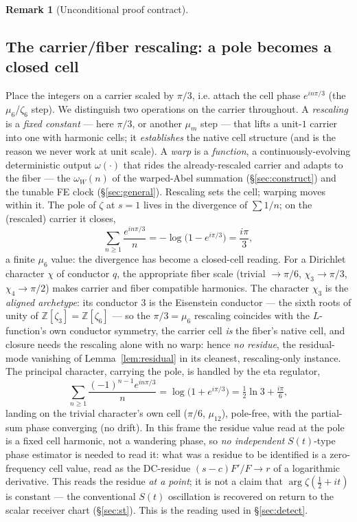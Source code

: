 \documentclass[11pt]{article}
\theoremstyle{definition}
\newtheorem{remark}[theorem]{Remark}
\begin{document}
\begin{remark}[Unconditional proof contract]
\begin{enumerate}
\section{The carrier/fiber rescaling: a pole becomes a closed cell}\label{sec:carrier}

Place the integers on a carrier scaled by $\pi/3$, i.e. attach the cell phase $e^{in\pi/3}$ (the
$\mu_6$/$\zeta_6$ step). We distinguish two operations on the carrier throughout. A \emph{rescaling} is a
\emph{fixed constant} --- here $\pi/3$, or another $\mu_m$ step --- that lifts a unit-$1$ carrier into one
with harmonic cells; it \emph{establishes} the native cell structure (and is the reason we never work at
unit scale). A \emph{warp} is a \emph{function}, a continuously-evolving deterministic output
$\omega(\cdot)$ that rides the already-rescaled carrier and adapts to the fiber --- the $\omega_W(n)$ of the
warped-Abel summation (\S\ref{sec:construct}) and the tunable FE clock (\S\ref{sec:general}). Rescaling sets
the cell; warping moves within it. The pole of $\zeta$ at $s=1$ lives in the divergence of $\sum 1/n$; on
the (rescaled) carrier it closes,
\[
  \sum_{n\ge1}\frac{e^{in\pi/3}}{n}=-\log\!\big(1-e^{i\pi/3}\big)=\frac{i\pi}{3},
\]
a finite $\mu_6$ value: the divergence has become a closed-cell reading. For a Dirichlet character
$\chi$ of conductor $q$, the appropriate fiber scale (trivial $\to\pi/6$, $\chi_3\to\pi/3$,
$\chi_4\to\pi/2$) makes carrier and fiber compatible harmonics. The character $\chi_3$ is the
\emph{aligned archetype}: its conductor $3$ is the Eisenstein conductor --- the sixth roots of unity of
$\mathbb Z[\zeta_3]=\mathbb Z[\zeta_6]$ --- so the $\pi/3=\mu_6$ rescaling coincides with the $L$-function's
own conductor symmetry, the carrier cell \emph{is} the fiber's native cell, and closure needs the rescaling
alone with no warp: hence \emph{no residue}, the residual-mode vanishing of Lemma~\ref{lem:residual} in its
cleanest, rescaling-only instance. The principal character, carrying the
pole, is handled by the eta regulator,
\[
  \sum_{n\ge1}\frac{(-1)^{n-1}e^{in\pi/3}}{n}=\log\!\big(1+e^{i\pi/3}\big)=\tfrac12\ln3+\tfrac{i\pi}{6},
\]
landing on the trivial character's own cell ($\pi/6$, $\mu_{12}$), pole-free, with the partial-sum
phase converging (no drift). In this frame the residue value read at the pole is a fixed cell harmonic, not a
wandering phase, so \emph{no independent} $S(t)$-type phase estimator is needed to read it: what was a residue
to be identified is a zero-frequency cell value, read as the DC-residue $(s-c)F'/F\to r$ of a logarithmic
derivative. This reads the residue \emph{at a point}; it is not a claim that $\arg\zeta(\tfrac12+it)$ is
constant --- the conventional $S(t)$ oscillation is recovered on return to the scalar receiver chart
(\S\ref{sec:st}). This is the reading used in \S\ref{sec:detect}.


\end{enumerate}
\end{remark}
\end{document}
